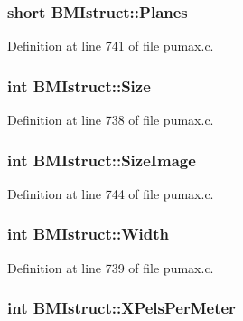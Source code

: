\hypertarget{struct_b_m_istruct_a29b39d5bd71bb03b8b09b0de1a4b9c8d}{
\subsubsection[{\-Planes}]{\setlength{\rightskip}{0pt plus 5cm}short {\bf \-B\-M\-Istruct\-::\-Planes}}}
\label{struct_b_m_istruct_a29b39d5bd71bb03b8b09b0de1a4b9c8d}


\-Definition at line 741 of file pumax.\-c.

\hypertarget{struct_b_m_istruct_acfe239d5fa92bc82701fafaf72efcacf}{
\subsubsection[{\-Size}]{\setlength{\rightskip}{0pt plus 5cm}int {\bf \-B\-M\-Istruct\-::\-Size}}}
\label{struct_b_m_istruct_acfe239d5fa92bc82701fafaf72efcacf}


\-Definition at line 738 of file pumax.\-c.

\hypertarget{struct_b_m_istruct_a11df57e6d765d04cd654eb68e9ed5606}{
\subsubsection[{\-Size\-Image}]{\setlength{\rightskip}{0pt plus 5cm}int {\bf \-B\-M\-Istruct\-::\-Size\-Image}}}
\label{struct_b_m_istruct_a11df57e6d765d04cd654eb68e9ed5606}


\-Definition at line 744 of file pumax.\-c.

\hypertarget{struct_b_m_istruct_a6486fcb19864264947f29b30c5a1d6e9}{
\subsubsection[{\-Width}]{\setlength{\rightskip}{0pt plus 5cm}int {\bf \-B\-M\-Istruct\-::\-Width}}}
\label{struct_b_m_istruct_a6486fcb19864264947f29b30c5a1d6e9}


\-Definition at line 739 of file pumax.\-c.

\hypertarget{struct_b_m_istruct_ad14c3cac819fdb1563374c2ef4913aac}{
\subsubsection[{\-X\-Pels\-Per\-Meter}]{\setlength{\rightskip}{0pt plus 5cm}int {\bf \-B\-M\-Istruct\-::\-X\-Pels\-Per\-Meter}}}
\label{struct_b_m_istruct_ad14c3cac819fdb1563374c2ef4913aac}


